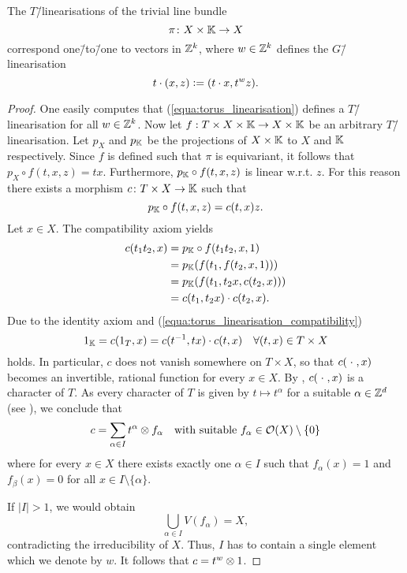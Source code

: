 \begin{lemma}
	The $T$\=/linearisations of the trivial line bundle 
	$$\pi\colon X \times \mathbb{K} \rightarrow X$$
	correspond one\=/to\=/one to vectors in $\mathbb{Z}^k$, where $w\in\mathbb{Z}^k$ defines the $G$\=/linearisation
	\begin{equation}
		\label{equa:torus_linearisation}
		t\cdot(x,z) \mathrel{\mathop:}= (t\cdot x, t^w z).
	\end{equation}
\end{lemma}
\begin{proof}
	One easily computes that (\ref{equa:torus_linearisation}) defines a $T$\=/linearisation for all $w\in\mathbb{Z}^k$. Now let $f:T\times X\times\mathbb{K} \rightarrow X\times\mathbb{K}$ be an arbitrary $T$\=/linearisation. Let $p_X$ and $p_{\mathbb{K}}$ be the projections of $X\times\mathbb{K}$ to $X$ and $\mathbb{K}$ respectively. Since $f$ is defined such that $\pi$ is equivariant, it follows that $p_X \circ f (t, x, z) = tx$. Furthermore, $p_{\mathbb{K}} \circ f(t,x,z)$ is linear w.r.t. $z$. For this reason there exists a morphism $c\colon T \times X \rightarrow \mathbb{K}$ such that
	$$p_{\mathbb{K}} \circ f(t,x,z)=c(t,x)z.$$
	Let $x\in X$. The compatibility axiom yields
	\begin{equation}
		\begin{aligned}
			c(t_1t_2, x) & = p_{\mathbb{K}}\circ f(t_1t_2, x, 1) \\
			& = p_{\mathbb{K}}(f(t_1, f(t_2, x, 1))) \\
			&= p_{\mathbb{K}}(f(t_1, t_2x, c(t_2,x))) \\
			&= c(t_1, t_2x)\cdot c(t_2, x).
		\end{aligned}
		\label{equa:torus_linearisation_compatibility}
	\end{equation}
	Due to the identity axiom and (\ref{equa:torus_linearisation_compatibility})
	$$1_{\mathbb{K}} = c(1_T, x) = c(t^{-1}, tx)\cdot c(t, x) \quad \forall (t,x)\in T\times X$$
	holds. In particular, $c$ does not vanish somewhere on $T\times X$, so that $c(\mathrel{\;\cdot\;},x)$ becomes an invertible, rational function for every $x\in X$. By \cite[Proposition 3]{rationality_questiongs_algebraic_groups}, $c(\mathrel{\;\cdot\;},x)$ is a character of $T$. As every character of $T$ is given by $t\mapsto t^\alpha$ for a suitable $\alpha\in\mathbb{Z}^d$ (see \cite[§16]{linear_algebraic_groups}), we conclude that 
	$$c = \sum_{\alpha\in I} t^\alpha \otimes f_\alpha \quad\text{with suitable}\ f_\alpha\in \mathcal{O}(X)\setminus\{0\}$$
	where for every $x\in X$ there exists exactly one $\alpha\in I$ such that $f_\alpha(x) = 1$ and $f_\beta(x) = 0$ for all $x\in I\setminus\{\alpha\}$.
	
	If $|I|>1$, we would obtain
	$$\bigcup_{\alpha\in I} V(f_\alpha) = X,$$
	contradicting the irreducibility of $X$. Thus, $I$ has to contain a single element which we denote by $w$. It follows that $c = t^w \otimes 1$.	
\end{proof}

